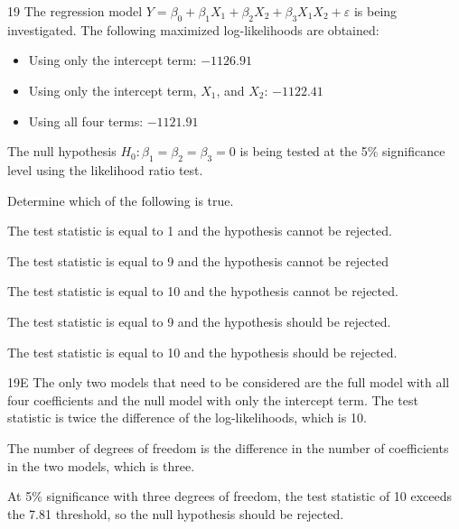 \begin{question}{19}
The regression model $Y = \beta_0 + \beta_1 X_1 + \beta_2 X_2 + \beta_3 X_1 X_2 + \varepsilon$ is being investigated. The following maximized log-likelihoods are obtained:
\begin{itemize}
\item Using only the intercept term: $-1126.91$
\item Using only the intercept term, $X_1$, and $X_2$: $-1122.41$
\item Using all four terms: $-1121.91$
\end{itemize}
The null hypothesis $H_0 : \beta_1 = \beta_2 = \beta_3 = 0$ is being tested at the 5\% significance level using the likelihood ratio test.

Determine which of the following is true.

\begin{choices}
\item The test statistic is equal to 1 and the hypothesis cannot be rejected.
\item The test statistic is equal to 9 and the hypothesis cannot be rejected
\item The test statistic is equal to 10 and the hypothesis cannot be rejected.
\item The test statistic is equal to 9 and the hypothesis should be rejected.
\item The test statistic is equal to 10 and the hypothesis should be rejected.
\end{choices}
\end{question}
\begin{solution}{19}{E}
The only two models that need to be considered are the full model with all four coefficients and the null model with only the intercept term. The test statistic is twice the difference of the log-likelihoods, which is 10.

The number of degrees of freedom is the difference in the number of coefficients in the two models, which is three.

At 5\% significance with three degrees of freedom, the test statistic of 10 exceeds the 7.81 threshold, so the null hypothesis should be rejected.
\end{solution}

